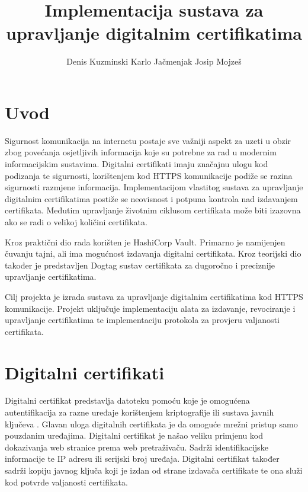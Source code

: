 \documentclass[]{foi}
\title{Implementacija sustava za upravljanje digitalnim certifikatima}
\author{Denis Kuzminski \newline Karlo Jačmenjak \newline Josip Mojzeš}
\begin{document}
\maketitle

\tableofcontents

\makeatletter {} \makeatother
\pagestyle{plain}

\chapter{Uvod}

Sigurnost komunikacija na internetu postaje sve važniji aspekt za uzeti u obzir zbog povećanja osjetljivih informacija koje su potrebne za rad u modernim informacijskim sustavima.
Digitalni certifikati imaju značajnu ulogu kod podizanja te sigurnosti, korištenjem kod HTTPS komunikacije podiže se razina sigurnosti razmjene informacija.
Implementacijom vlastitog sustava za upravljanje digitalnim certifikatima postiže se neovisnost i potpuna kontrola nad izdavanjem certifikata.
Međutim upravljanje životnim ciklusom certifikata može biti izazovna ako se radi o velikoj količini certifikata.

Kroz praktični dio rada korišten je HashiCorp Vault.
Primarno je namijenjen čuvanju tajni, ali ima mogućnost izdavanja digitalni certifikata.
Kroz teorijski dio također je predstavljen Dogtag sustav certifikata za dugoročno i preciznije upravljanje certifikatima.

Cilj projekta je izrada sustava za upravljanje digitalnim certifikatima kod HTTPS komunikacije.
Projekt uključuje implementaciju alata za izdavanje, revociranje i upravljanje certifikatima te implementaciju protokola za provjeru valjanosti certifikata.


\chapter{Digitalni certifikati}

Digitalni certifikat predstavlja datoteku pomoću koje je omogućena autentifikacija za razne uređaje korištenjem kriptografije ili sustava javnih ključeva \cite{fortinet-digital-certificates}.
Glavan uloga digitalnih certifikata je da omoguće mrežni pristup samo pouzdanim uređajima.
Digitalni certifikat je našao veliku primjenu kod dokazivanja web stranice prema web pretraživaču.
Sadrži identifikacijske informacije te IP adresu ili serijski broj uređaja.
Digitalni certifikat također sadrži kopiju javnog ključa koji je izdan od strane izdavača certifikate te ona služi kod potvrde valjanosti certifikata.
\end{document}
